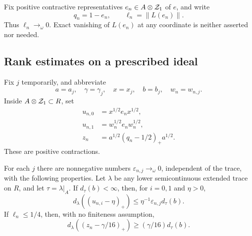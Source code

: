 Fix positive contractive representatives
$e_n\in A\otimes\mathcal Z_1$ of $e$, and write
\begin{equation}\label{setup:representatives}
 q_n=1-e_n,\qquad \ell_n=\|L(e_n)\|.
\end{equation}
Thus $\ell_n\to_\omega0$.  Exact vanishing of $L(e_n)$ at any
coordinate is neither asserted nor needed.

\subsection{Rank estimates on a prescribed ideal}

Fix $j$ temporarily, and abbreviate
\[
 a=a_j,\quad \gamma=\gamma_j,\quad
 x=x_j,\quad b=b_j,\quad w_n=w_{n,j}.
\]
Inside $A\otimes\mathcal Z_1\subset R$, set
\begin{equation}\label{trace:coordinate-positives}
 \begin{split}
 u_{n,0}&=x^{1/2}e_nx^{1/2},\\
 u_{n,1}&=w_n^{1/2}e_nw_n^{1/2},\\
 z_n&=a^{1/2}(q_n-1/2)_+a^{1/2}.
 \end{split}
\end{equation}
These are positive contractions.

\begin{lemma}\label{trace:rank}
For each $j$ there are nonnegative numbers
$\varepsilon_{n,j}\to_\omega0$, independent of the trace, with the
following properties.  Let $\lambda$ be any lower semicontinuous
extended trace on $R$, and let $\tau=\lambda|_A$.  If
$d_\tau(b)<\infty$, then, for $i=0,1$ and $\eta>0$,
\begin{equation}\label{trace:small-rank}
 d_\lambda((u_{n,i}-\eta)_+)
   \leq\eta^{-1}\varepsilon_{n,j}d_\tau(b).
\end{equation}
If $\ell_n\leq1/4$, then, with no finiteness assumption,
\begin{equation}\label{trace:large-rank}
 d_\lambda((z_n-\gamma/16)_+)
   \geq(\gamma/16)d_\tau(b).
\end{equation}
\end{lemma}

